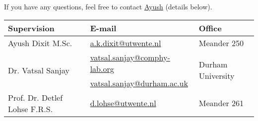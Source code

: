 \documentclass[a4paper,10pt]{article}
\begin{document}
If you have any questions, feel free to contact \href{mailto:a.k.dixit@utwente.nl}{Ayush} (details below).
\begin{center}
\begin{tabular}{|l|l|l|}
\hline \textbf{Supervision} & \textbf{E-mail} & \textbf{Office} \\
\hline Ayush Dixit M.Sc. & \href{mailto:a.k.dixit@utwente.nl}{a.k.dixit@utwente.nl} & Meander 250 \\
\hline \multirow{2}{*}{Dr. Vatsal Sanjay} & \href{mailto:vatsal.sanjay@comphy-lab.org}{vatsal.sanjay@comphy-lab.org} & \multirow{2}{*}{Durham University} \\
& \href{mailto:vatsal.sanjay@durham.ac.uk}{vatsal.sanjay@durham.ac.uk} & \\
\hline Prof. Dr. Detlef Lohse F.R.S. & \href{mailto:d.lohse@utwente.nl}{d.lohse@utwente.nl} & Meander 261  \\
\hline
\end{tabular}
\end{center}
\end{document}
